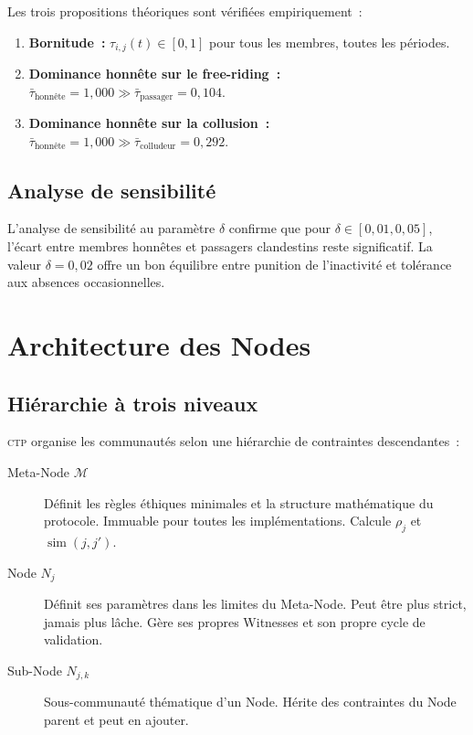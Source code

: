 \documentclass[12pt,a4paper]{article}
\theoremstyle{definition}
\theoremstyle{plain}
\theoremstyle{remark}
\newcommand{\CTP}{\textsc{ctp}}
\newcommand{\trustscore}{\tau}
\newcommand{\1}{\mathbf{1}}
\begin{document}
Les trois propositions théoriques sont vérifiées empiriquement~:

\begin{enumerate}
  \item \textbf{Bornitude~:} $\trustscore_{i,j}(t) \in [0,1]$ pour tous les
    membres, toutes les périodes. \hfill \checkmark

  \item \textbf{Dominance honnête sur le free-riding~:}
    $\bar{\trustscore}_{\text{honnête}} = 1{,}000 \gg
    \bar{\trustscore}_{\text{passager}} = 0{,}104$. \hfill \checkmark

  \item \textbf{Dominance honnête sur la collusion~:}
    $\bar{\trustscore}_{\text{honnête}} = 1{,}000 \gg
    \bar{\trustscore}_{\text{colludeur}} = 0{,}292$. \hfill \checkmark
\end{enumerate}

\subsection{Analyse de sensibilité}

L'analyse de sensibilité au paramètre $\delta$ confirme que pour
$\delta \in [0{,}01, 0{,}05]$, l'écart entre membres honnêtes et passagers
clandestins reste significatif. La valeur $\delta = 0{,}02$ offre un bon
équilibre entre punition de l'inactivité et tolérance aux absences
occasionnelles.

\section{Architecture des Nodes}
\label{sec:architecture}

\subsection{Hiérarchie à trois niveaux}

\CTP{} organise les communautés selon une hiérarchie de contraintes
descendantes~:

\begin{description}
  \item[Meta-Node $\mathcal{M}$] Définit les règles éthiques minimales et la
    structure mathématique du protocole. Immuable pour toutes les
    implémentations. Calcule $\rho_j$ et $\operatorname{sim}(j, j')$.

  \item[Node $N_j$] Définit ses paramètres dans les limites du Meta-Node.
    Peut être plus strict, jamais plus lâche. Gère ses propres Witnesses et
    son propre cycle de validation.

  \item[Sub-Node $N_{j,k}$] Sous-communauté thématique d'un Node. Hérite des
    contraintes du Node parent et peut en ajouter.
\end{description}
\end{document}
